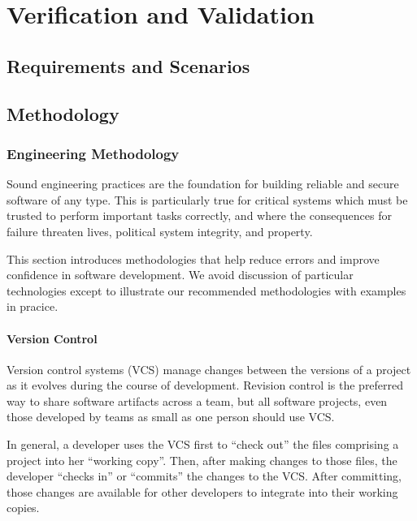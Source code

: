 \chapter{Verification and Validation}
\label{chapter:v_and_v}

\section{Requirements and Scenarios}
\section{Methodology}

\subsection{Engineering Methodology}


Sound engineering practices are the foundation for building reliable
and secure software of any type. This is particularly true for
critical systems which must be trusted to perform important tasks
correctly, and where the consequences for failure threaten lives,
political system integrity, and property.

This section introduces methodologies that help reduce errors and
improve confidence in software development. We avoid discussion of
particular technologies except to illustrate our recommended
methodologies with examples in pracice.

\subsubsection{Version Control}

Version control systems (VCS) manage changes between the versions of a
project as it evolves during the course of development. Revision
control is the preferred way to share software artifacts across a
team, but all software projects, even those developed by teams as
small as one person should use VCS.

In general, a developer uses the VCS first to ``check out'' the files
comprising a project into her ``working copy''. Then, after making
changes to those files, the developer ``checks in'' or ``commits'' the
changes to the VCS. After committing, those changes are available for
other developers to integrate into their working copies.

